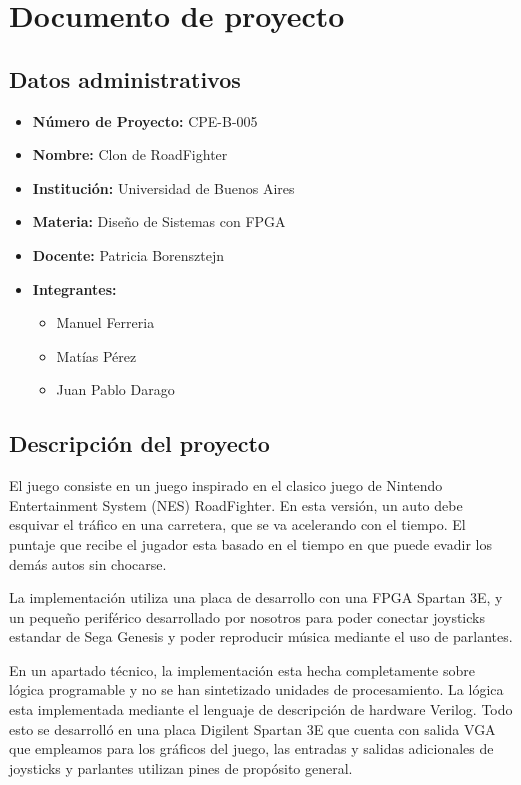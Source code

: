 \documentclass[10pt, a4paper,english,spanish]{article}
\begin{document}
\section{Documento de proyecto}

\subsection{Datos administrativos}

\begin{itemize}
	\item \textbf{N\'umero de Proyecto:} CPE-B-005
	\item \textbf{Nombre:} Clon de RoadFighter
	\item \textbf{Instituci\'on:} Universidad de Buenos Aires
	\item \textbf{Materia:} Dise\~no de Sistemas con FPGA
	\item \textbf{Docente:} Patricia Borensztejn
	\item \textbf{Integrantes:} \begin{itemize}
		\item Manuel Ferreria
		\item Mat\'ias P\'erez
		\item Juan Pablo Darago
	\end{itemize} 
\end{itemize}

\subsection{Descripci\'on del proyecto}

El juego consiste en un juego inspirado en el clasico juego de Nintendo
Entertainment System (NES) RoadFighter. En esta versión, un auto debe
esquivar el tráfico en una carretera, que se va acelerando con el tiempo.
El puntaje que recibe el jugador esta basado en el tiempo en que puede
evadir los demás autos sin chocarse.

La implementación utiliza una placa de desarrollo con una FPGA Spartan 3E, 
y un pequeño periférico desarrollado por nosotros para poder conectar
joysticks estandar de Sega Genesis y poder reproducir música mediante el
uso de parlantes. 

En un apartado técnico, la implementación esta hecha completamente 
sobre lógica programable y no se han sintetizado unidades de procesamiento.
La lógica esta implementada mediante el lenguaje de descripción de hardware
Verilog. Todo esto se desarrolló en una placa Digilent Spartan 3E que 
cuenta con salida VGA que empleamos para los gráficos del juego, las entradas
y salidas adicionales de joysticks y parlantes utilizan pines de propósito
general. 
\end{document}
